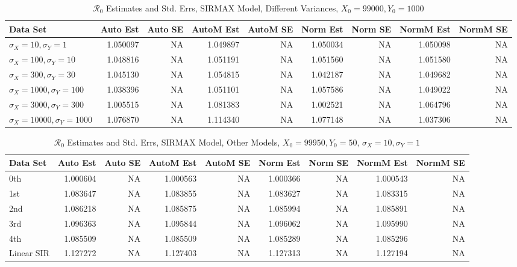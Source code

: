 \documentclass[12pt]{article}
\newcommand{\rr}{\ensuremath{\mathcal{R}_0}}
\begin{document}
\begin{table}[H]
	
	\caption{$\rr$ Estimates and Std. Errs, SIRMAX Model,
		Different Variances, 
		$X_0 = 99000, Y_0 = 1000$}
	\begin{footnotesize}
		\hskip -1.7cm
		\begin{tabular}{l|r|r|r|r|r|r|r|r}
			\hline
			Data Set & Auto Est & Auto SE & AutoM Est & AutoM SE & Norm Est & Norm SE & NormM Est & NormM SE\\
			\hline
			$\sigma_X = 10, \sigma_Y = 1$ & 1.050097 & NA & 1.049897 & NA & 1.050034 & NA & 1.050098 & NA\\
			\hline
			$\sigma_X = 100, \sigma_Y = 10$ & 1.048816 & NA & 1.051191 & NA & 1.051560 & NA & 1.051580 & NA\\
			\hline
			$\sigma_X = 300, \sigma_Y = 30$ & 1.045130 & NA & 1.054815 & NA & 1.042187 & NA & 1.049682 & NA\\
			\hline
			$\sigma_X = 1000, \sigma_Y = 100$ & 1.038396 & NA & 1.051101 & NA & 1.057586 & NA & 1.049022 & NA\\
			\hline
			$\sigma_X = 3000, \sigma_Y = 300$ & 1.005515 & NA & 1.081383 & NA & 1.002521 & NA & 1.064796 & NA\\
			\hline
			$\sigma_X = 10000, \sigma_Y = 1000$ & 1.076870 & NA & 1.114340 & NA & 1.077148 & NA & 1.037306 & NA\\
			\hline
		\end{tabular}
	\end{footnotesize}
\end{table}

\begin{table}[H]
	
	\caption{$\rr$ Estimates and Std. Errs, SIRMAX Model,
		Other Models, $X_0 = 99950, Y_0 = 50$, 
		$\sigma_X = 10, \sigma_Y = 1$}
	\begin{footnotesize}
		\hskip -1cm
		\begin{tabular}{l|r|r|r|r|r|r|r|r}
			\hline
			Data Set & Auto Est & Auto SE & AutoM Est & AutoM SE & Norm Est & Norm SE & NormM Est & NormM SE\\
			\hline
			0th & 1.000604 & NA & 1.000563 & NA & 1.000366 & NA & 1.000543 & NA\\
			\hline
			1st & 1.083647 & NA & 1.083855 & NA & 1.083627 & NA & 1.083315 & NA\\
			\hline
			2nd & 1.086218 & NA & 1.085875 & NA & 1.085994 & NA & 1.085891 & NA\\
			\hline
			3rd & 1.096363 & NA & 1.095844 & NA & 1.096062 & NA & 1.095990 & NA\\
			\hline
			4th & 1.085509 & NA & 1.085509 & NA & 1.085289 & NA & 1.085296 & NA\\
			\hline
			Linear SIR & 1.127272 & NA & 1.127403 & NA & 1.127313 & NA & 1.127194 & NA\\
			\hline
		\end{tabular}
	\end{footnotesize}
\end{table}
\end{document}
